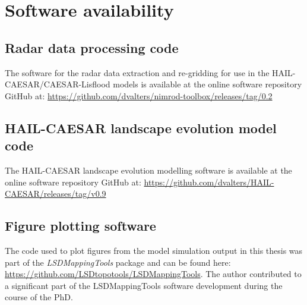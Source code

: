 
\chapter{Software availability}

\section{Radar data processing code}
The software for the radar data extraction and re-gridding for use in the HAIL-CAESAR/CAESAR-Lisflood models is available at the online software repository GitHub at: \url{https://github.com/dvalters/nimrod-toolbox/releases/tag/0.2}


\section{HAIL-CAESAR landscape evolution model code}
The HAIL-CAESAR landscape evolution modelling software is available at the online software repository GitHub at: \url{https://github.com/dvalters/HAIL-CAESAR/releases/tag/v0.9}

\section{Figure plotting software}
The code used to plot figures from the model simulation output in this thesis was part of the \textit{LSDMappingTools} package and can be found here: \url{https://github.com/LSDtopotools/LSDMappingTools}. The author contributed to a significant part of the LSDMappingTools software development during the course of the PhD.

